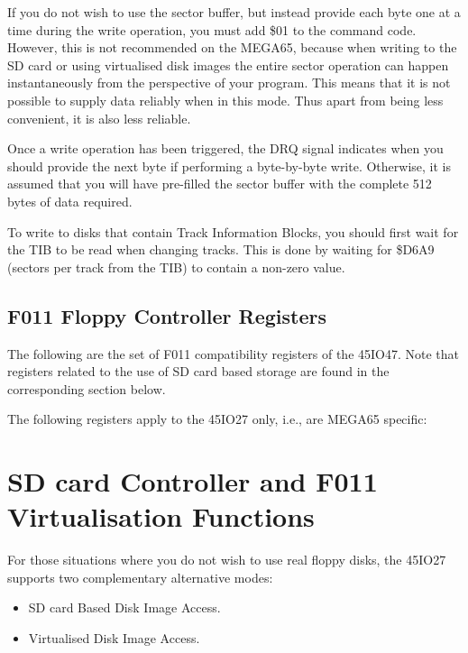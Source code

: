 If you do not wish
to use the sector buffer, but instead provide each byte one at a time
during the write operation, you must add \$01 to the command code.
However, this is not recommended on the MEGA65, because when writing
to the SD card or using virtualised disk images the entire sector
operation can happen instantaneously from the perspective of your
program.  This means that it is not possible to supply data reliably
when in this mode.  Thus apart from being less convenient, it is also
less reliable. 

Once a write operation has been triggered, the DRQ signal indicates
when you should provide the next byte if performing a byte-by-byte
write. Otherwise, it is assumed that you will have pre-filled the
sector buffer with the complete 512 bytes of data required.

To write to disks that contain Track Information Blocks,
you should first wait for the TIB to be read when changing tracks. This is done by waiting
for \$D6A9 (sectors per track from the TIB) to contain a non-zero value.

\subsection{F011 Floppy Controller Registers}

The following are the set of F011 compatibility registers of the 45IO47.
Note that registers related to the use of SD card based storage are found in the corresponding section below.



The following registers apply to the 45IO27 only, i.e., are MEGA65 specific:



\section{SD card Controller and F011 Virtualisation Functions}

For those situations where you do not wish to use real floppy disks,
the 45IO27 supports two complementary alternative modes:

\begin{itemize}
\item SD card Based Disk Image Access.
\item Virtualised Disk Image Access.
\end{itemize}

